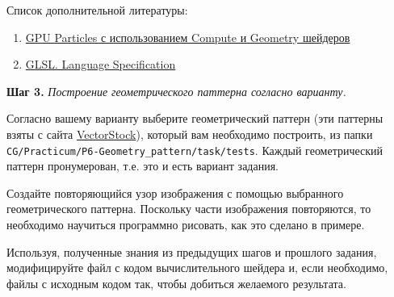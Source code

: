 \documentclass[a4paper,12pt]{article}
\begin{document}
    Список дополнительной литературы:
    \begin{enumerate}
        \item \href{https://habr.com/ru/articles/248755/}{GPU Particles с использованием Compute и Geometry шейдеров}
        \item \href{https://www.khronos.org/registry/OpenGL/specs/gl/}{GLSL. Language Specification}
    \end{enumerate}
    
    \textbf{Шаг 3.} \textit{Построение геометрического паттерна согласно варианту.}
    
    Согласно вашему варианту выберите геометрический паттерн (эти паттерны взяты с сайта \href{https://www.vectorstock.com}{VectorStock}), который вам необходимо построить, из папки 
     \texttt{CG/Practicum/P6-Geometry\_pattern/task/tests}. 
    Каждый геометрический паттерн пронумерован, т.е. это и есть вариант задания.
    
    Создайте повторяющийся узор изображения с помощью выбранного геометрического паттерна. Поскольку части изображения повторяются, то необходимо научиться программно рисовать, как это сделано в примере.
    
    Используя, полученные знания из предыдущих шагов и прошлого задания, модифицируйте файл с кодом вычислительного шейдера и, если необходимо, файлы с исходным кодом так, чтобы добиться желаемого результата.
    
\end{document}
